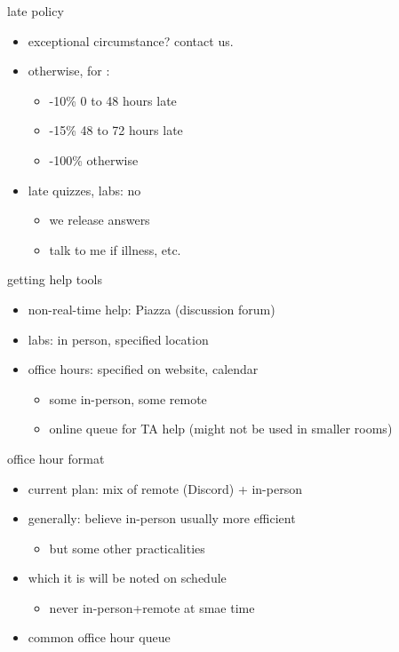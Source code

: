 \begin{frame}{late policy}
    \begin{itemize}
    \item exceptional circumstance? contact us.
    \item otherwise, for :
        \begin{itemize}
        \item -10\% 0 to 48 hours late
        \item -15\% 48 to 72 hours late
        \item -100\% otherwise
        \end{itemize}
    \item late quizzes, labs: no
        \begin{itemize}
        \item we release answers
        \item talk to me if illness, etc.
        \end{itemize}
    \end{itemize}
\end{frame}

\begin{frame}{getting help tools}
    \begin{itemize}
    \item non-real-time help: Piazza (discussion forum)
    \item labs: in person, specified location
    \item office hours: specified on website, calendar
        \begin{itemize}
        \item some in-person, some remote
        \item online queue for TA help (might not be used in smaller rooms)
        \end{itemize}
    \end{itemize}
\end{frame}

\begin{frame}{office hour format}
    \begin{itemize}
    \item current plan: mix of remote (Discord) + in-person
    \item generally: believe in-person usually more efficient
        \begin{itemize}
        \item but some other practicalities
        \end{itemize}
    \item which it is will be noted on schedule
        \begin{itemize}
        \item never in-person+remote at smae time
        \end{itemize}
    \item common office hour queue
    \end{itemize}
\end{frame}

